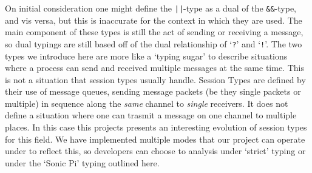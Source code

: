 \documentclass[11pt, abstracton, twoside]{scrartcl}
\begin{document}
On initial consideration one might define the \texttt{||}-type as a dual of the
\texttt{\&\&}-type, and vis versa, but this is inaccurate for the context in which
they are used. The main component of these types is still the act of sending or
receiving a message, so dual typings are still based off of the dual relationship
of `\texttt{?}' and `\texttt{!}'. The two types we introduce here are more like
a `typing sugar' to describe situations where a process can send and received
multiple messages at the same time. This is not a situation that session types
usually handle. Session Types are defined by their use of message queues, sending
message packets (be they single packets or multiple) in sequence along the 
\emph{same} channel to \emph{single} receivers. It does not define a situation
where one can trasmit a message on one channel to multiple places. In this case
this projects presents an interesting evolution of session types for this field.
We have implemented multiple modes that our project can operate under to reflect
this, so developers can choose to analysis under `strict' typing or under the
`Sonic Pi' typing outlined here.
\newpage
\end{document}
